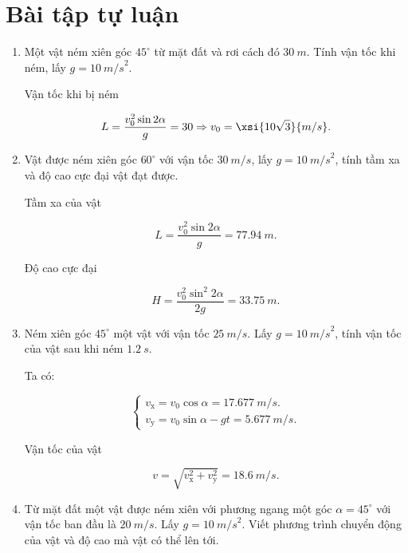 \section{Bài tập tự luận}
\begin{enumerate}[label=\bfseries Bài \arabic*:]
	\item {}
	
	
	{Một vật ném xiên góc $45^\circ$ từ mặt đất và rơi cách đó $\SI{30}{m}$. Tính vận tốc khi ném, lấy $g=\SI{10}{m/s}^2$.
	}
	
	\hideall
	{	
		
		Vận tốc khi bị ném
		
		$$L = \dfrac{v^2_0 \sin 2\alpha}{g} = 30 \Rightarrow v_0 = \xsi{10\sqrt 3}{m/s}.$$
	}
	
	
	\item {}
	
	
	{Vật được ném xiên góc $60^\circ$ với vận tốc $\SI{30}{m/s}$, lấy $g=\SI{10}{m/s}^2$, tính tầm xa và độ cao cực đại vật đạt được.
	}
	
	\hideall
	{	
		Tầm xa của vật
		
		$$L = \dfrac{v^2_0 \sin 2\alpha}{g} = \SI{77,94}{m}.$$
		
		Độ cao cực đại
		
		$$H = \dfrac{v^2_0\sin^2 2\alpha}{2g} = \SI{33,75}{m}.$$
		
	}
	\item {}
	
	
	
	{Ném xiên góc $45^\circ$ một vật với vận tốc $\SI{25}{m/s}$. Lấy $g=\SI{10}{m/s}^2$, tính vận tốc của vật sau khi ném $\SI{1,2}{s}$.
	}
	
	\hideall
	{	
		Ta có:
		
		$$\begin{cases}
			v_\text{x} = v_0 \cos \alpha = \SI{17,677}{m/s}.\\
			v_\text{y} = v_0 \sin \alpha - gt = \SI{5,677}{m/s}.
		\end{cases}$$
		
		Vận tốc của vật
		
		$$v = \sqrt{v^2_\text{x} + v^2_\text{y}} = \SI{18,6}{m/s}.$$
		
	}
	\item {}
	
	
	
	{Từ mặt đất một vật được ném xiên với phương ngang một góc $\alpha = 45^\circ$ với vận tốc ban đầu là $\SI{20}{m/s}$. Lấy $g=\SI{10}{m/s}^2$. Viết phương trình chuyển động của vật và độ cao mà vật có thể lên tới.
	}
	

\end{enumerate}
